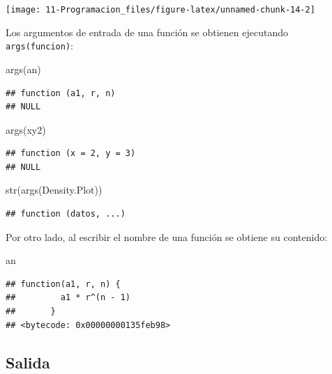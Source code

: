 \documentclass[
]{book}
\newenvironment{Shaded}{\begin{snugshade}}{\end{snugshade}}
\newcommand{\FunctionTok}[1]{\textcolor[rgb]{0.00,0.00,0.00}{#1}}
\newcommand{\NormalTok}[1]{#1}
\theoremstyle{break}
\theoremstyle{nonumberplain}
\begin{document}
\begin{center}\texttt{[image: 11-Programacion\_files/figure-latex/unnamed-chunk-14-2]} \end{center}

Los argumentos de entrada de una función se obtienen ejecutando \texttt{args(funcion)}:

\begin{Shaded}
\begin{Highlighting}[]
\FunctionTok{args}\NormalTok{(an)}
\end{Highlighting}
\end{Shaded}

\begin{verbatim}
## function (a1, r, n) 
## NULL
\end{verbatim}

\begin{Shaded}
\begin{Highlighting}[]
\FunctionTok{args}\NormalTok{(xy2)}
\end{Highlighting}
\end{Shaded}

\begin{verbatim}
## function (x = 2, y = 3) 
## NULL
\end{verbatim}

\begin{Shaded}
\begin{Highlighting}[]
\FunctionTok{str}\NormalTok{(}\FunctionTok{args}\NormalTok{(Density.Plot))}
\end{Highlighting}
\end{Shaded}

\begin{verbatim}
## function (datos, ...)
\end{verbatim}

Por otro lado, al escribir el nombre de una función se obtiene su
contenido:

\begin{Shaded}
\begin{Highlighting}[]
\NormalTok{an}
\end{Highlighting}
\end{Shaded}

\begin{verbatim}
## function(a1, r, n) {
##         a1 * r^(n - 1)
##       }
## <bytecode: 0x00000000135feb98>
\end{verbatim}

\hypertarget{salida}{%
\subsection{Salida}\label{salida}}
\end{document}

